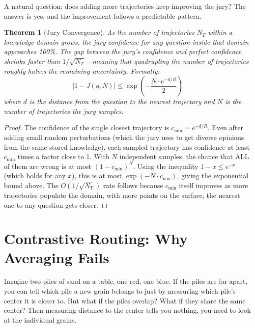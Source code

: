 \documentclass[11pt]{article}
\newtheorem{theorem}{Theorem}[section]
\begin{document}
A natural question: does adding more trajectories keep improving the jury?
The answer is yes, and the improvement follows a predictable pattern.

\begin{theorem}[Jury Convergence]\label{thm:convergence}
As the number of trajectories $N_T$ within a knowledge domain grows, the jury
confidence for any question inside that domain approaches 100\%. The gap
between the jury's confidence and perfect confidence shrinks faster than
$1/\sqrt{N_T}$---meaning that quadrupling the number of trajectories roughly
halves the remaining uncertainty. Formally:
\begin{equation}
|1 - J(q, N)| \le \exp\left(-\frac{N \cdot e^{-d/R}}{2}\right)
\end{equation}
where $d$ is the distance from the question to the nearest trajectory and $N$
is the number of trajectories the jury samples.
\end{theorem}
\begin{proof}
The confidence of the single closest trajectory is $c_{\min} = e^{-d/R}$.
Even after adding small random perturbations (which the jury uses to get
diverse opinions from the same stored knowledge), each sampled trajectory
has confidence at least $c_{\min}$ times a factor close to 1. With $N$
independent samples, the chance that ALL of them are wrong is at most
$(1 - c_{\min})^N$. Using the inequality $1 - x \le e^{-x}$ (which holds
for any $x$), this is at most $\exp(-N \cdot c_{\min})$, giving the
exponential bound above. The $O(1/\sqrt{N_T})$ rate follows because
$c_{\min}$ itself improves as more trajectories populate the domain, with
more points on the surface, the nearest one to any question gets closer.
\end{proof}

\newpage
\section{Contrastive Routing: Why Averaging Fails}

Imagine two piles of sand on a table, one red, one blue. If the piles are
far apart, you can tell which pile a new grain belongs to just by measuring
which pile's center it is closer to. But what if the piles overlap? What if
they share the same center? Then measuring distance to the center tells you
nothing, you need to look at the individual grains.
\end{document}

